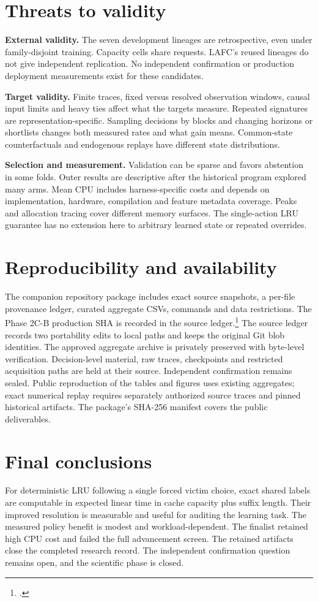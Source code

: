 \documentclass[11pt,letterpaper]{article}
\newcommand{\code}[1]{\texttt{\detokenize{#1}}}
\begin{document}
\section{Threats to validity}
\textbf{External validity.} The seven development lineages are retrospective, even under family-disjoint training. Capacity cells share requests. LAFC's reused lineages do not give independent replication. No independent confirmation or production deployment measurements exist for these candidates.

\textbf{Target validity.} Finite traces, fixed versus resolved observation windows, causal input limits and heavy ties affect what the targets measure. Repeated signatures are representation-specific. Sampling decisions by blocks and changing horizons or shortlists changes both measured rates and what gain means. Common-state counterfactuals and endogenous replays have different state distributions.

\textbf{Selection and measurement.} Validation can be sparse and favors abstention in some folds. Outer results are descriptive after the historical program explored many arms. Mean CPU includes harness-specific costs and depends on implementation, hardware, compilation and feature metadata coverage. Peaks and allocation tracing cover different memory surfaces. The single-action LRU guarantee has no extension here to arbitrary learned state or repeated overrides.

\section{Reproducibility and availability}
The companion repository package includes exact source snapshots, a per-file provenance ledger, curated aggregate CSVs, commands and data restrictions. The Phase 2C-B production SHA is recorded in the source ledger.\footnote{\code{59af9788394c25d026676302f133b2718459afa9}.} The source ledger records two portability edits to local paths and keeps the original Git blob identities. The approved aggregate archive is privately preserved with byte-level verification. Decision-level material, raw traces, checkpoints and restricted acquisition paths are held at their source. Independent confirmation remains sealed. Public reproduction of the tables and figures uses existing aggregates; exact numerical replay requires separately authorized source traces and pinned historical artifacts. The package's SHA-256 manifest covers the public deliverables.

\section{Final conclusions}
For deterministic LRU following a single forced victim choice, exact shared labels are computable in expected linear time in cache capacity plus suffix length. Their improved resolution is measurable and useful for auditing the learning task. The measured policy benefit is modest and workload-dependent. The finalist retained high CPU cost and failed the full advancement screen. The retained artifacts close the completed research record. The independent confirmation question remains open, and the scientific phase is closed.
\end{document}
